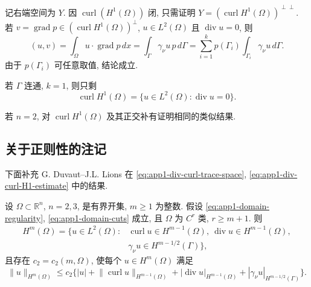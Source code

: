 \begin{Proof}
记右端空间为 $Y$. 因 $\operatorname{curl}(H^1(\Omega))$ 闭, 只需证明 $Y=(\operatorname{curl}H^1(\Omega))^{\perp\perp}$. 若 $v=\operatorname{grad}p\in(\operatorname{curl}H^1(\Omega))^\perp$, $u\in L^2(\Omega)$ 且 $\operatorname{div}u=0$, 则
\[
(u,v)=\int_\Omega u\cdot\operatorname{grad}p\,dx
=\int_\Gamma\gamma_\nu u\,p\,d\Gamma
=\sum_{i=1}^kp(\Gamma_i)\int_{\Gamma_i}\gamma_\nu u\,d\Gamma.
\]
由于 $p(\Gamma_i)$ 可任意取值, 结论成立.
\end{Proof}

\begin{Remark}
\label{rem:app1-connected-boundary-curl-range}
若 $\Gamma$ 连通, $k=1$, 则只剩
\[
\operatorname{curl}H^1(\Omega)
=\{u\in L^2(\Omega):\operatorname{div}u=0\}.
\]
\end{Remark}

\begin{Remark}
\label{rem:app1-two-dimensional-analogue}
若 $n=2$, 对 $\operatorname{curl}H^1(\Omega)$ 及其正交补有证明相同的类似结果.
\end{Remark}

\subsection{关于正则性的注记}
\label{subsec:app1-regularity}

下面补充 G. Duvaut--J.L. Lions 在 \eqref{eq:app1-div-curl-trace-space}, \eqref{eq:app1-div-curl-H1-estimate} 中的结果.

\begin{Proposition}
\label{prop:app1-div-curl-regularity}
设 $\Omega\subset\mathbb R^n$, $n=2,3$, 是有界开集, $m\geq1$ 为整数. 假设 \eqref{eq:app1-domain-regularity}, \eqref{eq:app1-domain-cuts} 成立, 且 $\Omega$ 为 $C^r$ 类, $r\geq m+1$. 则
\begin{equation}
\begin{aligned}
H^m(\Omega)=\{u\in L^2(\Omega):
&\operatorname{curl}u\in H^{m-1}(\Omega),
\ \operatorname{div}u\in H^{m-1}(\Omega),\\
&\gamma_\nu u\in H^{m-1/2}(\Gamma)\},
\end{aligned}
\label{eq:app1-div-curl-regularity-space}
\end{equation}
且存在 $c_2=c_2(m,\Omega)$, 使每个 $u\in H^m(\Omega)$ 满足
\begin{equation}
\lVert u\rVert_{H^m(\Omega)}
\leq c_2\{|u|+\lVert\operatorname{curl}u\rVert_{H^{m-1}(\Omega)}
+|\operatorname{div}u|_{H^{m-1}(\Omega)}
+|\gamma_\nu u|_{H^{m-1/2}(\Gamma)}\}.
\label{eq:app1-div-curl-regularity-estimate}
\end{equation}
\end{Proposition}

